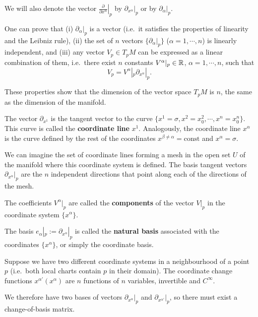 \begin{points}
\item We will also denote the vector $\left.\frac{\partial}{\partial x^\alpha}\right|_p$ by $\partial_{x^\alpha}|_p$ or by $\partial_\alpha|_p$.

\item One can prove that (i) $\partial_\alpha|_p$ is a vector (i.e.\ it satisfies the properties of linearity and the Leibniz rule), (ii) the set of $n$ vectors $\{\partial_\alpha|_p\}$ ($\alpha=1,\cdots,n$) is linearly independent, and (iii) any vector $V_p\in T_pM$ can be expressed as a linear combination of them, i.e.\ there exist $n$ constants $V^\alpha|_p\in\mathbb{R}$, $\alpha=1,\cdots,n$, such that
\[
  V_p=V^\alpha|_p\partial_{x^\alpha}|_p .
\]

\item These properties show that the dimension of the vector space $T_pM$ is $n$, the same as the dimension of the manifold.

\item The vector $\partial_{x^1}$ is the tangent vector to the curve $\{x^1=\sigma,x^2=x_0^2,\cdots,x^n=x_0^n\}$. This curve is called the \textbf{coordinate line} $x^1$. Analogously, the coordinate line $x^\alpha$ is the curve defined by the rest of the coordinates $x^{\beta\neq\alpha}=\text{const}$ and $x^\alpha=\sigma$.

\item We can imagine the set of coordinate lines forming a mesh in the open set $U$ of the manifold where this coordinate system is defined. The basis tangent vectors $\partial_{x^\alpha}|_p$ are the $n$ independent directions that point along each of the directions of the mesh.

\item The coefficients $V^\alpha|_p$ are called the \textbf{components} of the vector $V|_p$ in the coordinate system $\{x^\alpha\}$.

\item The basis $e_\alpha|_p:=\partial_{x^\alpha}|_p$ is called the \textbf{natural basis} associated with the coordinates $\{x^\alpha\}$, or simply the coordinate basis.

\item Suppose we have two different coordinate systems in a neighbourhood of a point $p$ (i.e.\ both local charts contain $p$ in their domain). The coordinate change functions $x^{\alpha'}(x^\alpha)$ are $n$ functions of $n$ variables, invertible and $C^\infty$.

\item We therefore have two bases of vectors $\partial_{x^\alpha}|_p$ and $\partial_{x^{\alpha'}}|_p$, so there must exist a change-of-basis matrix.


\end{points}
